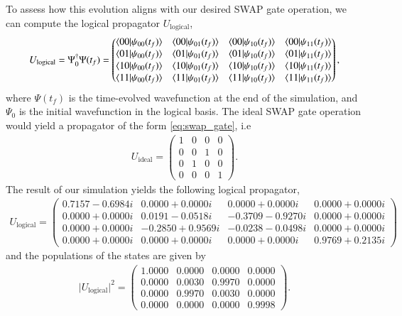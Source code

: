 \documentclass{subfiles}
\begin{document}
To assess how this evolution aligns with our desired SWAP gate operation, we can compute the logical propagator $U_{\text{logical}}$,
\begin{align*}
    U_{\text{logical}} = \Psi_0^\dagger\Psi(t_f) = \begin{pmatrix}
        \braket{00|\psi_{00}(t_f)} & \braket{00|\psi_{01}(t_f)} & \braket{00|\psi_{10}(t_f)} & \braket{00|\psi_{11}(t_f)} \\
        \braket{01|\psi_{00}(t_f)} & \braket{01|\psi_{01}(t_f)} & \braket{01|\psi_{10}(t_f)} & \braket{01|\psi_{11}(t_f)} \\
        \braket{10|\psi_{00}(t_f)} & \braket{10|\psi_{01}(t_f)} & \braket{10|\psi_{10}(t_f)} & \braket{10|\psi_{11}(t_f)} \\
        \braket{11|\psi_{00}(t_f)} & \braket{11|\psi_{01}(t_f)} & \braket{11|\psi_{10}(t_f)} & \braket{11|\psi_{11}(t_f)}
    \end{pmatrix},
\end{align*}
where $\Psi(t_f)$ is the time-evolved wavefunction at the end of the simulation, and $\Psi_0$ is the initial wavefunction in the logical basis. The ideal SWAP gate operation would yield a propagator of the form \eqref{eq:swap_gate}, i.e
\begin{align*}
    U_{\text{ideal}} = \begin{pmatrix}
        1 & 0 & 0 & 0 \\
        0 & 0 & 1 & 0 \\
        0 & 1 & 0 & 0 \\
        0 & 0 & 0 & 1
    \end{pmatrix}.
\end{align*}
The result of our simulation yields the following logical propagator,
\begin{align*}
U_{\text{logical}}
=
\begin{pmatrix}
 0.7157 - 0.6984i & 0.0000 + 0.0000i & 0.0000 + 0.0000i & 0.0000 + 0.0000i \\
 0.0000 + 0.0000i & 0.0191 - 0.0518i & -0.3709 - 0.9270i & 0.0000 + 0.0000i \\
 0.0000 + 0.0000i & -0.2850 + 0.9569i & -0.0238 - 0.0498i & 0.0000 + 0.0000i \\
 0.0000 + 0.0000i & 0.0000 + 0.0000i & 0.0000 + 0.0000i & 0.9769 + 0.2135i
\end{pmatrix}
\end{align*}
and the populations of the states are given by
\begin{align*}
\lvert U_{\text{logical}}\rvert^2
=
\begin{pmatrix}
1.0000 & 0.0000 & 0.0000 & 0.0000 \\
0.0000 & 0.0030 & 0.9970 & 0.0000 \\
0.0000 & 0.9970 & 0.0030 & 0.0000 \\
0.0000 & 0.0000 & 0.0000 & 0.9998
\end{pmatrix}.
\end{align*}
\end{document}
